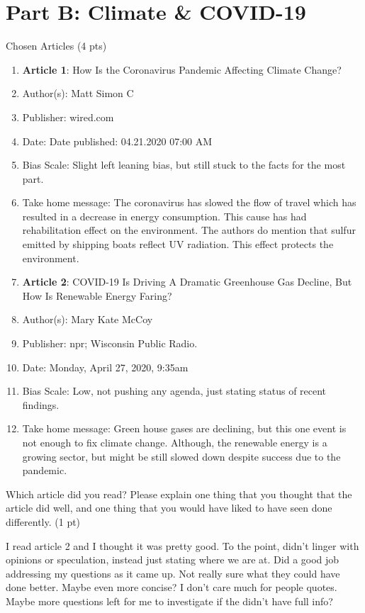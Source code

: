 \documentclass[12pt,a4paper]{article}
\begin{document}
\section*{Part B: Climate \& COVID-19}
\begin{enumerate}[font=\bfseries, wide, resume]
    {\color{under}\item Chosen Articles (4 pts)}
        \begin{enumerate}[label=\alph*.]
            \item \textbf{Article 1}: How Is the Coronavirus Pandemic Affecting Climate Change?
            \item Author(s): Matt Simon C
            \item Publisher: wired.com
            \item Date: Date published: 04.21.2020 07:00 AM
            \item Bias Scale: Slight left leaning bias, but still stuck to the facts for the most part.
            \item Take home message: The coronavirus has slowed the flow of travel which has resulted in a decrease in energy consumption. This cause has had rehabilitation effect on the environment. The authors do mention that sulfur emitted by shipping boats reflect UV radiation. This effect protects the environment. 
            \vspace{15pt}
            \item \textbf{Article 2}: COVID-19 Is Driving A Dramatic Greenhouse Gas Decline, But How Is Renewable Energy Faring?
            \item Author(s): Mary Kate McCoy
            \item Publisher: npr; Wisconsin Public Radio.
            \item Date: Monday, April 27, 2020, 9:35am
            \item Bias Scale: Low, not pushing any agenda, just stating status of recent findings.
            \item Take home message: Green house gases are declining, but this one event is not enough to fix climate change. Although, the renewable energy is a growing sector, but might be still slowed down despite success due to the pandemic.
        \end{enumerate}
    {\color{under}\item Which article did you read? Please explain one thing that you thought that the article did well, and one thing that you would have liked to have seen done differently. (1 pt)}
    
    I read article 2 and I thought it was pretty good. To the point, didn't linger with opinions or speculation, instead just stating where we are at. Did a good job addressing my questions as it came up. Not really sure what they could have done better. Maybe even more concise? I don't care much for people quotes. Maybe more questions left for me to investigate if the didn't have full info? 
    
\end{enumerate}
    
\end{document}
